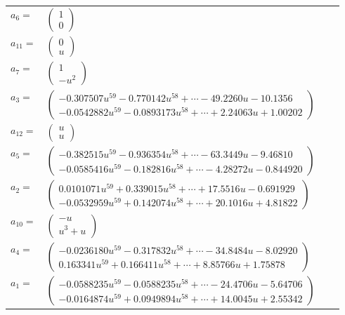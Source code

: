 \documentclass[1p]{elsarticle_modified}
\theoremstyle{definition}
\begin{document}
\begin{tabular}{m{7pt} m{180pt} m{7pt} m{180pt} }
\flushright $a_{6}=$&$\begin{pmatrix}1\\0\end{pmatrix}$ \\
\flushright $a_{11}=$&$\begin{pmatrix}0\\u\end{pmatrix}$ \\
\flushright $a_{7}=$&$\begin{pmatrix}1\\- u^2\end{pmatrix}$ \\
\flushright $a_{3}=$&$\begin{pmatrix}-0.307507 u^{59}-0.770142 u^{58}+\cdots-49.2260 u-10.1356\\-0.0542882 u^{59}-0.0893173 u^{58}+\cdots+2.24063 u+1.00202\end{pmatrix}$ \\
\flushright $a_{12}=$&$\begin{pmatrix}u\\u\end{pmatrix}$ \\
\flushright $a_{5}=$&$\begin{pmatrix}-0.382515 u^{59}-0.936354 u^{58}+\cdots-63.3449 u-9.46810\\-0.0585416 u^{59}-0.182816 u^{58}+\cdots-4.28272 u-0.844920\end{pmatrix}$ \\
\flushright $a_{2}=$&$\begin{pmatrix}0.0101071 u^{59}+0.339015 u^{58}+\cdots+17.5516 u-0.691929\\-0.0532959 u^{59}+0.142074 u^{58}+\cdots+20.1016 u+4.81822\end{pmatrix}$ \\
\flushright $a_{10}=$&$\begin{pmatrix}- u\\u^3+u\end{pmatrix}$ \\
\flushright $a_{4}=$&$\begin{pmatrix}-0.0236180 u^{59}-0.317832 u^{58}+\cdots-34.8484 u-8.02920\\0.163341 u^{59}+0.166411 u^{58}+\cdots+8.85766 u+1.75878\end{pmatrix}$ \\
\flushright $a_{1}=$&$\begin{pmatrix}-0.0588235 u^{59}-0.0588235 u^{58}+\cdots-24.4706 u-5.64706\\-0.0164874 u^{59}+0.0949894 u^{58}+\cdots+14.0045 u+2.55342\end{pmatrix}$ \\

\end{tabular}
\end{document}

